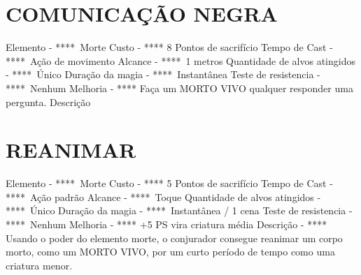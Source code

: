 \documentclass{article}%
\begin{document}
\section{COMUNICAÇÃO NEGRA}%
\label{sec:COMUNICAONEGRA}%
Elemento {-} ****~Morte\newline%
Custo {-} **** 8 Pontos de sacrifício\newline%
Tempo de Cast {-} ****~Ação de movimento\newline%
Alcance {-} ****~1 metros\newline%
Quantidade de alvos atingidos {-} ****~Único\newline%
Duração da magia {-} ****~Instantânea\newline%
Teste de resistencia {-} ****~Nenhum\newline%
Melhoria {-} **** Faça um MORTO VIVO qualquer responder uma pergunta.\newline%
Descrição \newline%

%
\section{REANIMAR}%
\label{sec:REANIMAR}%
Elemento {-} ****~Morte\newline%
Custo {-} **** 5 Pontos de sacrifício\newline%
Tempo de Cast {-} ****~Ação padrão\newline%
Alcance {-} ****~Toque\newline%
Quantidade de alvos atingidos {-} ****~Único\newline%
Duração da magia {-} ****~Instantânea / 1 cena\newline%
Teste de resistencia {-} ****~Nenhum\newline%
Melhoria {-} **** +5 PS vira criatura média\newline%
Descrição {-} **** Usando o poder do elemento morte, o conjurador consegue reanimar um corpo morto, como um MORTO VIVO, por um curto período de tempo como uma criatura menor.\newline%

%
\end{document}
